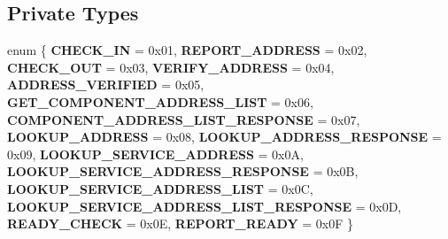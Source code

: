 \subsection*{\-Private \-Types}
\begin{DoxyCompactItemize}
\item 
enum \{ \*
{\bfseries \-C\-H\-E\-C\-K\-\_\-\-I\-N} =  0x01, 
{\bfseries \-R\-E\-P\-O\-R\-T\-\_\-\-A\-D\-D\-R\-E\-S\-S} =  0x02, 
{\bfseries \-C\-H\-E\-C\-K\-\_\-\-O\-U\-T} =  0x03, 
{\bfseries \-V\-E\-R\-I\-F\-Y\-\_\-\-A\-D\-D\-R\-E\-S\-S} =  0x04, 
\*
{\bfseries \-A\-D\-D\-R\-E\-S\-S\-\_\-\-V\-E\-R\-I\-F\-I\-E\-D} =  0x05, 
{\bfseries \-G\-E\-T\-\_\-\-C\-O\-M\-P\-O\-N\-E\-N\-T\-\_\-\-A\-D\-D\-R\-E\-S\-S\-\_\-\-L\-I\-S\-T} =  0x06, 
{\bfseries \-C\-O\-M\-P\-O\-N\-E\-N\-T\-\_\-\-A\-D\-D\-R\-E\-S\-S\-\_\-\-L\-I\-S\-T\-\_\-\-R\-E\-S\-P\-O\-N\-S\-E} =  0x07, 
{\bfseries \-L\-O\-O\-K\-U\-P\-\_\-\-A\-D\-D\-R\-E\-S\-S} =  0x08, 
\*
{\bfseries \-L\-O\-O\-K\-U\-P\-\_\-\-A\-D\-D\-R\-E\-S\-S\-\_\-\-R\-E\-S\-P\-O\-N\-S\-E} =  0x09, 
{\bfseries \-L\-O\-O\-K\-U\-P\-\_\-\-S\-E\-R\-V\-I\-C\-E\-\_\-\-A\-D\-D\-R\-E\-S\-S} =  0x0\-A, 
{\bfseries \-L\-O\-O\-K\-U\-P\-\_\-\-S\-E\-R\-V\-I\-C\-E\-\_\-\-A\-D\-D\-R\-E\-S\-S\-\_\-\-R\-E\-S\-P\-O\-N\-S\-E} =  0x0\-B, 
{\bfseries \-L\-O\-O\-K\-U\-P\-\_\-\-S\-E\-R\-V\-I\-C\-E\-\_\-\-A\-D\-D\-R\-E\-S\-S\-\_\-\-L\-I\-S\-T} =  0x0\-C, 
\*
{\bfseries \-L\-O\-O\-K\-U\-P\-\_\-\-S\-E\-R\-V\-I\-C\-E\-\_\-\-A\-D\-D\-R\-E\-S\-S\-\_\-\-L\-I\-S\-T\-\_\-\-R\-E\-S\-P\-O\-N\-S\-E} =  0x0\-D, 
{\bfseries \-R\-E\-A\-D\-Y\-\_\-\-C\-H\-E\-C\-K} =  0x0\-E, 
{\bfseries \-R\-E\-P\-O\-R\-T\-\_\-\-R\-E\-A\-D\-Y} =  0x0\-F
 \}
\end{DoxyCompactItemize}
